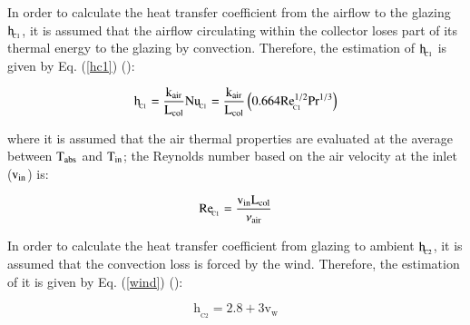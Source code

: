 In order to calculate the heat transfer coefficient from the airflow to the glazing $\rm{h_{\!_{C1}}}$, it is assumed that the airflow circulating within the collector loses part of its thermal energy to the glazing by convection. Therefore, the estimation of $\rm{h_{\!_{C1}}}$ is given by Eq. (\ref{hc1}) (\cite{Zheng2016}):

\vspace{-0.75cm}
\begin{equation}
\mathrm{{h_{\!_{C1}}} = \frac{k_{air}}{L_{col}}{Nu_{\!_{C1}}} = \frac{{{k_{air}}}}{{{L_{col}}}}\left( {0.664{\rm{Re}}_{\!_{C1}}^{1/2}{\rm{Pr}}^{1/3}} \right)}
\label{hc1}
\end{equation}

\noindent where it is assumed that the air thermal properties are evaluated at the average between $\rm{T_{abs}}$ and $\rm{T_{in}}$; the Reynolds number based on the air velocity at the inlet ($\rm{v_{in}}$) is:

\vspace{-0.75cm}
\begin{equation}
\mathrm{{{\mathop{\rm Re}\nolimits}_{\!_{C1}}} = \frac{{{v_{in}}{L_{col}}}}{{{\mathlarger{\nu}_{air}}}}}
\label{Rec1}
\end{equation}

In order to calculate the heat transfer coefficient from glazing to ambient $\rm{h_{\!_{C2}}}$, it is assumed that the convection loss is forced by the wind. Therefore, the estimation of it is given by Eq. (\ref{wind}) (\cite{Tchinda2008}):

\vspace{-0.75cm}
\begin{equation}
	\mathrm{h_{\!_{C2}} = 2.8 + 3v_w}
	\label{wind}
\end{equation}


%

